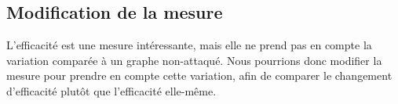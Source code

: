 \subsection{Modification de la mesure}
L'efficacité est une mesure intéressante, mais elle ne prend pas en compte la variation comparée à un graphe non-attaqué.
Nous pourrions donc modifier la mesure pour prendre en compte cette variation, afin de comparer le changement d'efficacité plutôt que l'efficacité elle-même.
